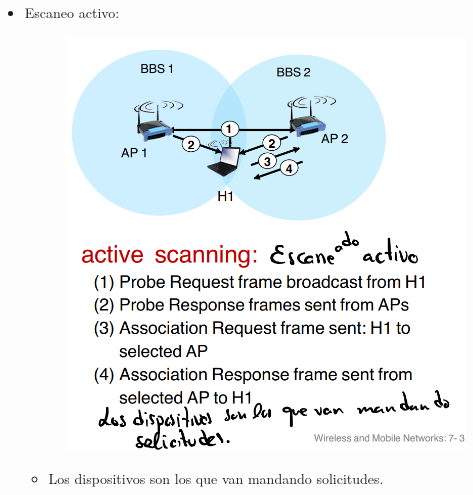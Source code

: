 \documentclass[12pt, twoside, openright]{report} %
\begin{document}
\begin{itemize}
\begin{itemize}
		      \item Escaneo activo:
		            \begin{figure}[H]
			            {\includegraphics[scale=.2]{Untitled 62.png}}
		            \end{figure}
		            \begin{itemize}
			            \item Los dispositivos son los que van mandando solicitudes.
		            \end{itemize}


\end{itemize}
\end{itemize}
\end{document}
